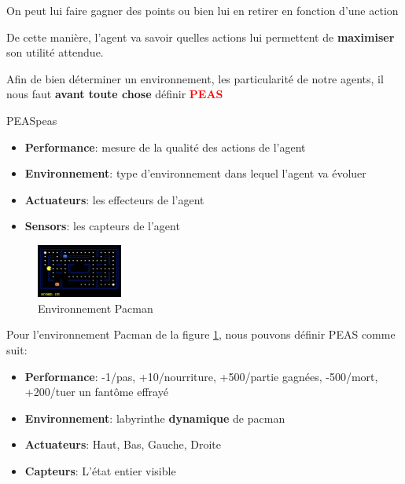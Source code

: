 \documentclass[a4paper, 12pt]{extarticle}
\begin{document}
\begin{example}\leavevmode
    On peut lui faire gagner des points ou bien lui en retirer en fonction d'une action
\end{example}
De cette manière, l'agent va savoir quelles actions lui permettent de \textbf{maximiser} son utilité attendue.

Afin de bien déterminer un environnement, les particularité de notre agents, il nous faut 
\textbf{avant toute chose} définir \textbf{\textcolor{red}{PEAS}}

\begin{definition}{PEAS}{peas}
    \begin{itemize}
        \item \textbf{Performance}: mesure de la qualité des actions de l'agent
        \item \textbf{Environnement}: type d'environnement dans lequel l'agent va évoluer
        \item \textbf{Actuateurs}: les effecteurs de l'agent
        \item \textbf{Sensors}: les capteurs de l'agent
    \end{itemize} 
\end{definition}

\begin{figure}[H]
    \begin{center}
        \includegraphics[width=0.25\textwidth]{./pictures/pacman.png}
    \end{center}
    \caption{Environnement Pacman}\label{fig:pacman}
\end{figure}

\begin{example}\leavevmode
    Pour l'environnement Pacman de la figure \ref{fig:pacman}, nous pouvons définir PEAS comme suit:
    \begin{itemize}
        \item \textbf{Performance}: -1/pas, +10/nourriture, +500/partie gagnées, -500/mort, +200/tuer un fantôme effrayé
        \item \textbf{Environnement}: labyrinthe \textbf{dynamique }de pacman
        \item \textbf{Actuateurs}: Haut, Bas, Gauche, Droite
        \item \textbf{Capteurs}: L'état entier visible
    \end{itemize}



\end{example}
\end{document}
